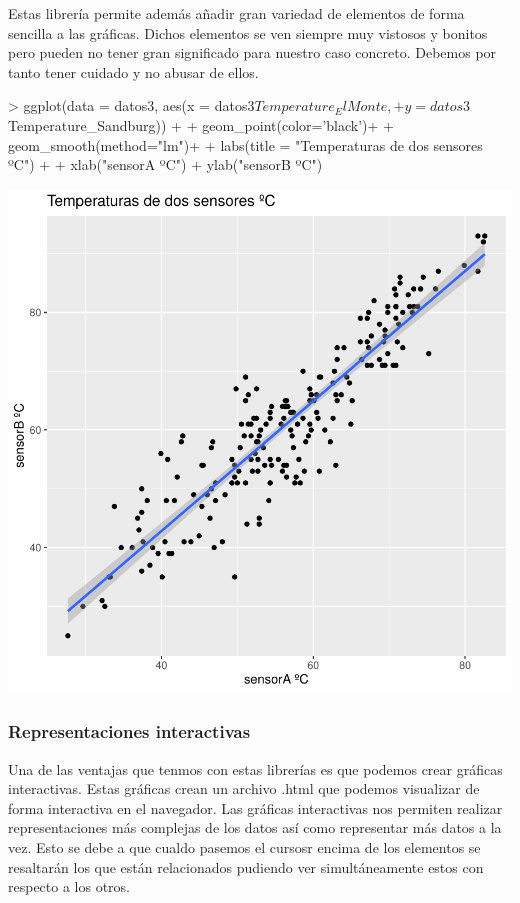 \documentclass [a4paper] {article}
\begin{document}
Estas librería permite además añadir gran variedad de elementos de forma sencilla a las gráficas.
Dichos elementos se ven siempre muy vistosos y bonitos pero pueden no tener gran significado para nuestro caso concreto.
Debemos por tanto tener cuidado y no abusar de ellos.
\begin{center}
\begin{Schunk}
\begin{Sinput}
> ggplot(data = datos3, aes(x = datos3$Temperature_ElMonte, 
+                           y = datos3$Temperature_Sandburg)) + 
+   geom_point(color='black')+
+   geom_smooth(method="lm")+ 
+   labs(title = "Temperaturas de dos sensores ºC") +
+   xlab("sensorA ºC") + ylab("sensorB ºC")
\end{Sinput}
\end{Schunk}
\includegraphics{entrega-ggplot2_se}
\end{center}

\subsubsection{Representaciones interactivas}
Una de las ventajas que tenmos con estas librerías es que podemos crear gráficas interactivas.
Estas gráficas crean un archivo .html que podemos visualizar de forma interactiva en el navegador.
Las gráficas interactivas nos permiten realizar representaciones más complejas de los datos así como representar más datos a la vez.
Esto se debe a que cualdo pasemos el cursosr encima de los elementos se resaltarán los que están relacionados pudiendo ver simultáneamente estos con respecto a los otros.
\end{document}
